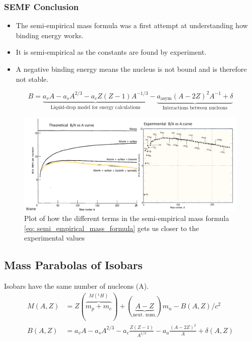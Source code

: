 \documentclass{article}
\begin{document}
\subsubsection{SEMF Conclusion}
\begin{itemize}
    \item The semi-empirical mass formula was a first attempt at understanding how binding energy works. 
    \item It is semi-empirical as the constants are found by experiment. 
    \item A negative binding energy means the nucleus is not bound and is therefore not stable.
\end{itemize}
\begin{equation}
B = \underbrace{a_vA - a_sA^{2 / 3} - a_cZ(Z-1)A^{-1 / 3}}_{\text{Liquid-drop model for energy calculations}} - \underbrace{a_{\text{asym}}(A-2Z)^2A^{-1} + δ}_{\text{Interactions between nucleons}}
\end{equation}
\begin{figure}[h!]
\centering
\includegraphics[width = \textwidth]{SEMF_term_addition.png}
\caption{Plot of how the different terms in the semi-empirical mass formula \cref{eq: semi_empirical_mass_formula} gets us closer to the experimental values}
\label{fig: SEMF_term_addition}
\end{figure}



\subsection{Mass Parabolas of Isobars}
Isobars have the same number of nucleons (A).
\begin{align}
M(A,Z) &= Z(\overbrace{m_p + m_e}^{M(_{}^{1}H_{})}) + (\underbrace{A-Z}_{\text{neut. num.}})m_n - B(A,Z) /c^2 \\
B(A,Z) &= a_vA - a_sA^{2 / 3} - a_c\frac{Z(Z-1)}{A^{1 / 3}} - a_a\frac{(A-2Z)^2}{A} + \delta(A,Z)
\end{align}
\end{document}
